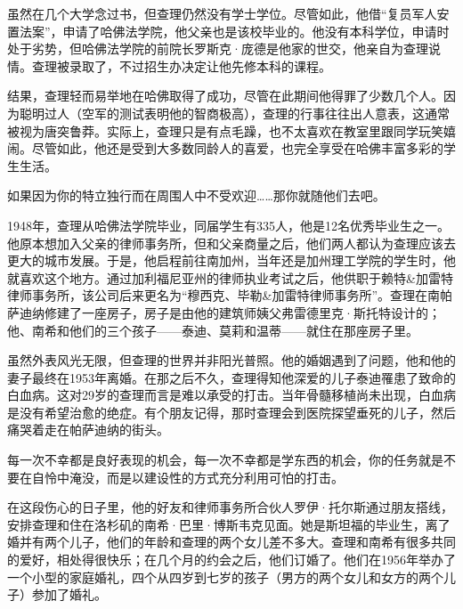 虽然在几个大学念过书，但查理仍然没有学士学位。尽管如此，他借“复员军人安置法案”，申请了哈佛法学院，他父亲也是该校毕业的。他没有本科学位，申请时处于劣势，但哈佛法学院的前院长罗斯克·庞德是他家的世交，他亲自为查理说情。查理被录取了，不过招生办决定让他先修本科的课程。
\par

结果，查理轻而易举地在哈佛取得了成功，尽管在此期间他得罪了少数几个人。因为聪明过人（空军的测试表明他的智商极高），查理的行事往往出人意表，这通常被视为唐突鲁莽。实际上，查理只是有点毛躁，也不太喜欢在教室里跟同学玩笑嬉闹。尽管如此，他还是受到大多数同龄人的喜爱，也完全享受在哈佛丰富多彩的学生生活。
\par

\begin{WisdomBox}
\par

如果因为你的特立独行而在周围人中不受欢迎……那你就随他们去吧。
\par
\end{WisdomBox}

1948年，查理从哈佛法学院毕业，同届学生有335人，他是12名优秀毕业生之一。他原本想加入父亲的律师事务所，但和父亲商量之后，他们两人都认为查理应该去更大的城市发展。于是，他启程前往南加州，当年还是加州理工学院的学生时，他就喜欢这个地方。通过加利福尼亚州的律师执业考试之后，他供职于赖特\&加雷特律师事务所，该公司后来更名为“穆西克、毕勒\&加雷特律师事务所”。查理在南帕萨迪纳修建了一座房子，房子是由他的建筑师姨父弗雷德里克·斯托特设计的；他、南希和他们的三个孩子——泰迪、莫莉和温蒂——就住在那座房子里。
\par

虽然外表风光无限，但查理的世界并非阳光普照。他的婚姻遇到了问题，他和他的妻子最终在1953年离婚。在那之后不久，查理得知他深爱的儿子泰迪罹患了致命的白血病。这对29岁的查理而言是难以承受的打击。当年骨髓移植尚未出现，白血病是没有希望治愈的绝症。有个朋友记得，那时查理会到医院探望垂死的儿子，然后痛哭着走在帕萨迪纳的街头。
\par

\begin{WisdomBox}
\par

每一次不幸都是良好表现的机会，每一次不幸都是学东西的机会，你的任务就是不要在自怜中淹没，而是以建设性的方式充分利用可怕的打击。
\par
\end{WisdomBox}

在这段伤心的日子里，他的好友和律师事务所合伙人罗伊·托尔斯通过朋友搭线，安排查理和住在洛杉矶的南希·巴里·博斯韦克见面。她是斯坦福的毕业生，离了婚并有两个儿子，他们的年龄和查理的两个女儿差不多大。查理和南希有很多共同的爱好，相处得很快乐；在几个月的约会之后，他们订婚了。他们在1956年举办了一个小型的家庭婚礼，四个从四岁到七岁的孩子（男方的两个女儿和女方的两个儿子）参加了婚礼。
\par

